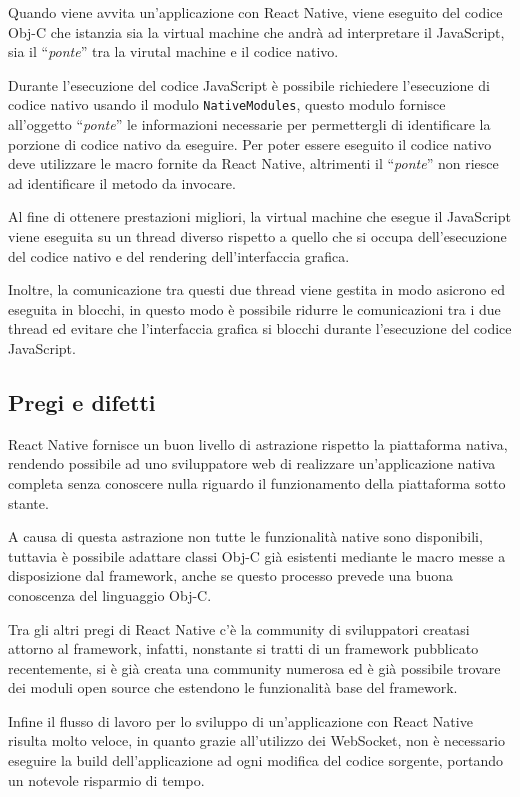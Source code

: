 Quando viene avvita un'applicazione con React Native, viene eseguito del codice Obj-C che istanzia sia la virtual machine che andrà ad interpretare il JavaScript, sia il ``\textit{ponte}'' tra la virutal machine e il codice nativo.

Durante l'esecuzione del codice JavaScript è possibile richiedere l'esecuzione di codice nativo usando il modulo \texttt{NativeModules}, questo modulo fornisce all'oggetto ``\textit{ponte}'' le informazioni necessarie per permettergli di identificare la porzione di codice nativo da eseguire.
Per poter essere eseguito il codice nativo deve utilizzare le macro fornite da React Native, altrimenti il ``\textit{ponte}'' non riesce ad identificare il metodo da invocare.

Al fine di ottenere prestazioni migliori, la virtual machine che esegue il JavaScript viene eseguita su un thread diverso rispetto a quello che si occupa dell'esecuzione del codice nativo e del rendering dell'interfaccia grafica.

Inoltre, la comunicazione tra questi due thread viene gestita in modo asicrono ed eseguita in blocchi, in questo modo è possibile ridurre le comunicazioni tra i due thread ed evitare che l'interfaccia grafica si blocchi durante l'esecuzione del codice JavaScript.

\subsection{Pregi e difetti}

React Native fornisce un buon livello di astrazione rispetto la piattaforma nativa, rendendo possibile ad uno sviluppatore web di realizzare un'applicazione nativa completa senza conoscere nulla riguardo il funzionamento della piattaforma sotto stante.

A causa di questa astrazione non tutte le funzionalità native sono disponibili, tuttavia è possibile adattare classi Obj-C già esistenti mediante le macro messe a disposizione dal framework, anche se questo processo prevede una buona conoscenza del linguaggio Obj-C.

Tra gli altri pregi di React Native c'è la community di sviluppatori creatasi attorno al framework, infatti, nonstante si tratti di un framework pubblicato recentemente, si è già creata una community numerosa ed è già possibile trovare dei moduli open source che estendono le funzionalità base del framework.

Infine il flusso di lavoro per lo sviluppo di un'applicazione con React Native risulta molto veloce, in quanto grazie all'utilizzo dei WebSocket, non è necessario eseguire la build dell'applicazione ad ogni modifica del codice sorgente, portando un notevole risparmio di tempo.

